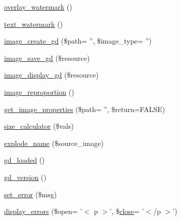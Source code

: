 \begin{DoxyCompactItemize}
\hyperlink{class_c_i___image__lib_a7fa0fd0aabe26803d61d7e09c1cb73de}{overlay\-\_\-watermark} ()
\item 
\hyperlink{class_c_i___image__lib_afb7640b6150e16b00efac0511d9fa03d}{text\-\_\-watermark} ()
\item 
\hyperlink{class_c_i___image__lib_a9de08e24f6573c9d80ccf38f95c33d1f}{image\-\_\-create\-\_\-gd} (\$path= '', \$image\-\_\-type= '')
\item 
\hyperlink{class_c_i___image__lib_a802a33d51249d4d31d59cbc89fbc4dd5}{image\-\_\-save\-\_\-gd} (\$resource)
\item 
\hyperlink{class_c_i___image__lib_af641d1806701b178dfba3dbf7da54462}{image\-\_\-display\-\_\-gd} (\$resource)
\item 
\hyperlink{class_c_i___image__lib_a55ee590fb313c50e99d6c1d4cd9618d2}{image\-\_\-reproportion} ()
\item 
\hyperlink{class_c_i___image__lib_a77ab93f41bdc26b9220b69a91644d854}{get\-\_\-image\-\_\-properties} (\$path= '', \$return=F\-A\-L\-S\-E)
\item 
\hyperlink{class_c_i___image__lib_a827549db4de2281a8f2b35ada2ef3909}{size\-\_\-calculator} (\$vals)
\item 
\hyperlink{class_c_i___image__lib_a32661288e0bea18ea50fbb7be6535af5}{explode\-\_\-name} (\$source\-\_\-image)
\item 
\hyperlink{class_c_i___image__lib_a04376d5530f38a1a61f59c2d769284ba}{gd\-\_\-loaded} ()
\item 
\hyperlink{class_c_i___image__lib_a7d141f85d677d5e6db12020009569fde}{gd\-\_\-version} ()
\item 
\hyperlink{class_c_i___image__lib_a892f1ba7cba3731a3fc68f1f64e92610}{set\-\_\-error} (\$msg)
\item 
\hyperlink{class_c_i___image__lib_a3ed4aa1a4d480c82bb1b663efd466aee}{display\-\_\-errors} (\$open= '$<$ p $>$', \$\hyperlink{bootstrap_8min_8js_ac581e13fc2b7b6ddfcf10b44940becde}{close}= '$<$/p $>$')
\end{DoxyCompactItemize}
